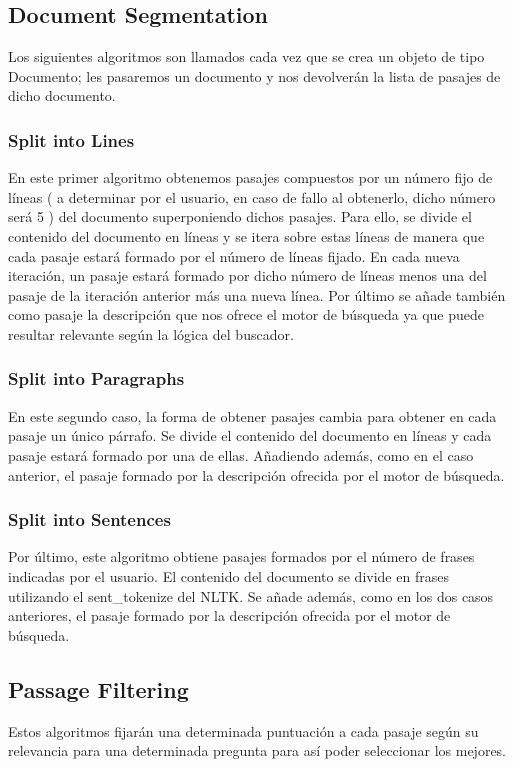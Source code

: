 \documentclass[12pt,a4paper,titlepage]{article}
\begin{document}
\subsection{Document Segmentation}
Los siguientes algoritmos son llamados cada vez que se crea un objeto de tipo Documento; les pasaremos un documento y nos devolverán la lista de pasajes de dicho documento.

\subsubsection{Split into Lines}
En este primer algoritmo obtenemos pasajes compuestos por un número fijo de líneas ( a determinar por el usuario, en caso de fallo al obtenerlo, dicho número será 5 ) del documento superponiendo dichos pasajes. Para ello, se divide el contenido del documento en líneas y se itera sobre estas líneas de manera que cada pasaje estará formado por el número de líneas fijado. En cada nueva iteración, un pasaje estará formado por dicho número de líneas menos una del pasaje de la iteración anterior más una nueva línea. Por último se añade también como pasaje la descripción que nos ofrece el motor de búsqueda ya que puede resultar relevante según la lógica del buscador.

\subsubsection{Split into Paragraphs}
En este segundo caso, la forma de obtener pasajes cambia para obtener en cada pasaje un único párrafo. Se divide el contenido del documento en líneas y cada pasaje estará formado por una de ellas. Añadiendo además, como en el caso anterior, el pasaje formado por la descripción ofrecida por el motor de búsqueda.

\subsubsection{Split into Sentences}
Por último, este algoritmo obtiene pasajes formados por el número de frases indicadas por el usuario. El contenido del documento se divide en frases utilizando el sent\_tokenize del NLTK. Se añade además, como en los dos casos anteriores, el pasaje formado por la descripción ofrecida por el motor de búsqueda.

\subsection{Passage Filtering}
Estos algoritmos fijarán una determinada puntuación a cada pasaje según su relevancia para una determinada pregunta para así poder seleccionar los mejores.
\end{document}
